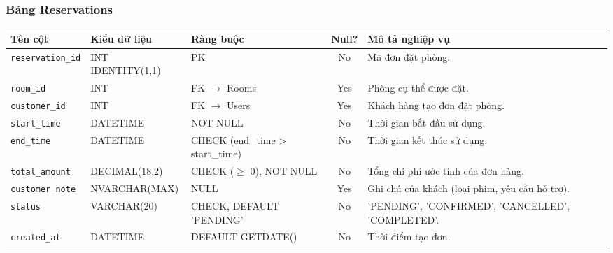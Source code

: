 \subsubsection{Bảng Reservations}
\begin{table}[H]
\centering
\small
\begin{tabularx}{\textwidth}{l l l c X}
\toprule
\textbf{Tên cột} & \textbf{Kiểu dữ liệu} & \textbf{Ràng buộc} & \textbf{Null?} & \textbf{Mô tả nghiệp vụ} \\
\midrule
\texttt{reservation\_id}& INT IDENTITY(1,1) & PK & No & Mã đơn đặt phòng. \\
\texttt{room\_id} & INT & FK $\rightarrow$ Rooms & Yes & Phòng cụ thể được đặt. \\
\texttt{customer\_id} & INT & FK $\rightarrow$ Users & Yes & Khách hàng tạo đơn đặt phòng. \\
\texttt{start\_time} & DATETIME & NOT NULL & No & Thời gian bắt đầu sử dụng. \\
\texttt{end\_time} & DATETIME & CHECK (end\_time > start\_time) & No & Thời gian kết thúc sử dụng. \\
\texttt{total\_amount} & DECIMAL(18,2) & CHECK ($\ge$ 0), NOT NULL & No & Tổng chi phí ước tính của đơn hàng. \\
\texttt{customer\_note}& NVARCHAR(MAX) & NULL & Yes & Ghi chú của khách (loại phim, yêu cầu hỗ trợ). \\
\texttt{status} & VARCHAR(20) & CHECK, DEFAULT 'PENDING' & No & 'PENDING', 'CONFIRMED', 'CANCELLED', 'COMPLETED'. \\
\texttt{created\_at} & DATETIME & DEFAULT GETDATE() & No & Thời điểm tạo đơn. \\
\bottomrule
\end{tabularx}
\end{table}

